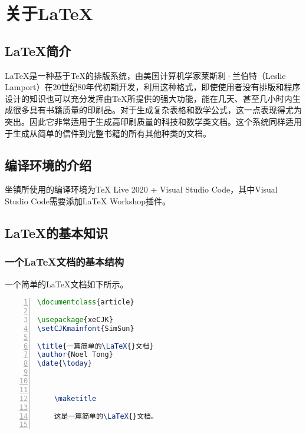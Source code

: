 

\chapter{关于\LaTeX{}}
\label{ch01}

\section{\LaTeX{}简介}

\LaTeX{}是一种基于\TeX{}的排版系统，由美国计算机学家莱斯利·兰伯特（Leslie Lamport）在20世纪80年代初期开发，利用这种格式，即使使用者没有排版和程序设计的知识也可以充分发挥由\TeX{}所提供的强大功能，能在几天、甚至几小时内生成很多具有书籍质量的印刷品。对于生成复杂表格和数学公式，这一点表现得尤为突出。因此它非常适用于生成高印刷质量的科技和数学类文档。这个系统同样适用于生成从简单的信件到完整书籍的所有其他种类的文档。

\section{编译环境的介绍}

坐镇所使用的编译环境为TeX Live 2020 + Visual Studio Code，其中Visual Studio Code需要添加\LaTeX{} Workshop插件。

\section{\LaTeX{}的基本知识}

\subsection{一个\LaTeX{}文档的基本结构}

一个简单的\LaTeX{}文档如下所示。

\begin{lstlisting}[language=tex, breaklines=true, basicstyle=\ttfamily, numbers=left, numberstyle=\tiny, frame=shadowbox]
\documentclass{article}
    
\usepackage{xeCJK}
\setCJKmainfont{SimSun}
    
\title{一篇简单的\LaTeX{}文档}
\author{Noel Tong}
\date{\today}
    

    
    \maketitle
        
    这是一篇简单的\LaTeX{}文档。
    

\end{lstlisting}

